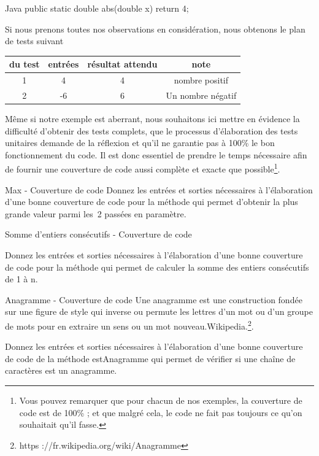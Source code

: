 \documentclass[a4paper,11pt]{article}
\begin{document}
	\begin{Code}{Java}
		public static double abs(double x) {
			return 4;
		}
	\end{Code}

	Si nous prenons toutes nos observations en considération, nous obtenons le plan de tests suivant

	\begin{center}
		\begin{tabular}{|c|c|c|c|}
			\hline
			\no du test & entrées & résultat attendu & note \\
			\hline
			1 & 4 & 4 & nombre positif \\
			\hline
			2 & -6 & 6 & Un nombre négatif \\
			\hline
		\end{tabular}
	\end{center}

	Même si notre exemple est aberrant, nous souhaitons ici mettre en évidence la difficulté d'obtenir des tests complets, que le processus d’élaboration des tests unitaires demande de la réflexion et qu’il ne garantie pas à 100\% le bon fonctionnement du code. Il est donc essentiel de prendre le temps nécessaire afin de fournir une couverture de code aussi complète et exacte que possible\footnote{Vous pouvez remarquer que pour chacun de nos exemples, la couverture de code est de 100\% ; et que malgré cela, le code ne fait pas toujours ce qu'on souhaitait qu'il fasse.}.

	\begin{Exercice}{Max - Couverture de code}
		Donnez les entrées et sorties nécessaires à l’élaboration d’une bonne couverture de code pour la méthode  qui permet d’obtenir la plus grande valeur parmi les~2 passées en paramètre.
	\end{Exercice}

	\begin{Exercice}{Somme d'entiers consécutifs - Couverture de code}
		
		Donnez les entrées et sorties nécessaires à l’élaboration d’une bonne couverture de code pour la méthode qui permet de calculer la somme des entiers consécutifs de 1 à n.
	\end{Exercice}

	\begin{Exercice}{Anagramme - Couverture de code}
		\og Une anagramme est une construction fondée sur une figure de style qui inverse ou permute les lettres d’un mot ou d’un groupe de mots pour en extraire un sens ou un mot nouveau.\fg Wikipedia.\footnote{https ://fr.wikipedia.org/wiki/Anagramme}. 

		Donnez les entrées et sorties nécessaires à l’élaboration d’une bonne couverture de code de la méthode estAnagramme qui permet de vérifier si une chaîne de caractères est un anagramme.
	\end{Exercice}
\end{document}
